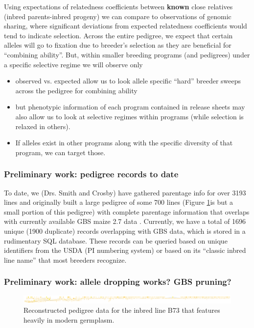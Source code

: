 \documentclass[draft,12pt]{article}
\begin{document}
Using expectations of relatedness coefficients between \textbf{known} close relatives (inbred parents-inbred progeny) we can compare to observations of genomic sharing, where significant deviations from expected relatedness coefficients would tend to indicate selection. 
Across the entire pedigree, we expect that certain alleles will go to fixation due to breeder's selection as they are beneficial for ``combining ability''. 
But, within smaller breeding programs (and pedigrees) under a specific selective regime we will observe only 



\begin{itemize}
\item observed vs. expected allow us to look allele specific ``hard'' breeder sweeps across the pedigree for combining ability
\item but phenotypic information of each program contained in release sheets may also allow us to look at selective regimes within programs (while selection is relaxed in others).
\item If alleles exist in other programs along with the specific diversity of that program, we can target those.
\end{itemize}



\subsubsection*{Preliminary work: pedigree records to date}
To date, we (Drs. Smith and Crosby) have gathered parentage info for over 3193 lines and originally built a large pedigree of some 700 lines (Figure \ref{fig:b73isbig}is but a small portion of this pedigree) with complete parentage information that overlaps with currently available GBS maize 2.7 data \citep{Glaubitz:2014eu}. 
Currently, we have a total of 1696 unique (1900 duplicate) records overlapping with GBS data, which is stored in a rudimentary SQL database. 
These records can be queried based on unique identifiers from the USDA (PI numbering system) or based on its ``classic inbred line name'' that most breeders recognize.


\subsubsection*{Preliminary work: allele dropping works? GBS pruning?}


\begin{figure}[ht]
\includegraphics[width=1.0\linewidth]{pedigree_poster.pdf}
\caption{Reconstructed pedigree data for the inbred line B73 that features heavily in modern germplasm.}
\label{fig:b73isbig}
\end{figure}
\end{document}
